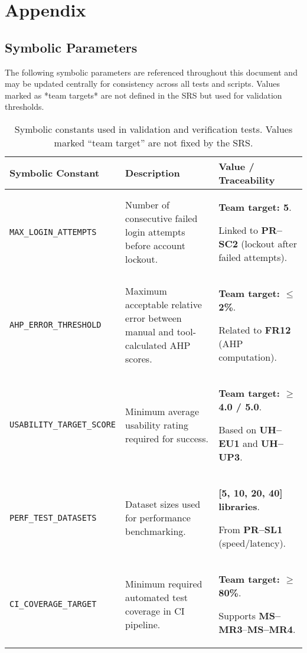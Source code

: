 \documentclass[12pt, titlepage]{article}
\begin{document}
% 

% 

\newpage

\section{Appendix}


\subsection{Symbolic Parameters}
\label{sec:symbolic-parameters}

The following symbolic parameters are referenced throughout this document and
may be updated centrally for consistency across all tests and scripts. Values
marked as *team targets* are not defined in the SRS but used for validation
thresholds.

\begin{table}[H]
\centering
\begin{tabularx}{\textwidth}{@{}l X X@{}}
\toprule
\textbf{Symbolic Constant} & \textbf{Description} & \textbf{Value / Traceability} \\
\midrule

\texttt{MAX\_LOGIN\_ATTEMPTS} &
Number of consecutive failed login attempts before account lockout. &
\textbf{Team target: 5}.\par
Linked to \textbf{PR--SC2} (lockout after failed attempts). \\

\texttt{AHP\_ERROR\_THRESHOLD} &
Maximum acceptable relative error between manual and tool-calculated AHP scores. &
\textbf{Team target: $\leq$ 2\%}.\par
Related to \textbf{FR12} (AHP computation). \\

\texttt{USABILITY\_TARGET\_SCORE} &
Minimum average usability rating required for success. &
\textbf{Team target: $\geq$ 4.0 / 5.0}.\par
Based on \textbf{UH--EU1} and \textbf{UH--UP3}. \\

\texttt{PERF\_TEST\_DATASETS} &
Dataset sizes used for performance benchmarking. &
\textbf{[5, 10, 20, 40] libraries}.\par
From \textbf{PR--SL1} (speed/latency). \\

\texttt{CI\_COVERAGE\_TARGET} &
Minimum required automated test coverage in CI pipeline. &
\textbf{Team target: $\geq$ 80\%}.\par
Supports \textbf{MS--MR3}–\textbf{MS--MR4}. \\

\bottomrule
\end{tabularx}
\caption{Symbolic constants used in validation and verification tests. Values marked “team target” are not fixed by the SRS.}
\end{table}
\end{document}
